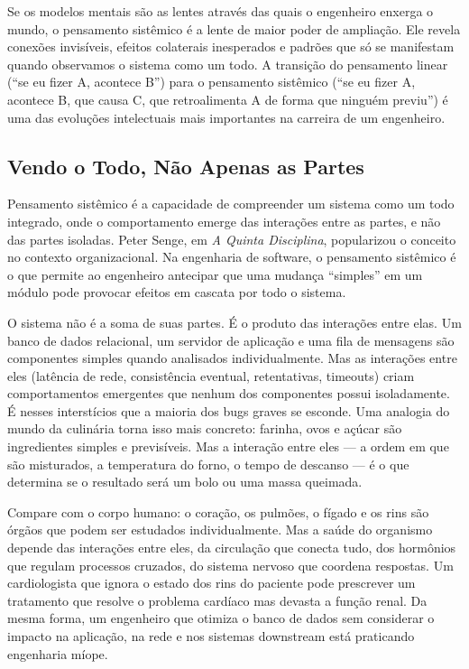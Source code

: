 Se os modelos mentais são as lentes através das quais o engenheiro
enxerga o mundo, o pensamento sistêmico é a lente de maior poder de
ampliação. Ele revela conexões invisíveis, efeitos colaterais inesperados
e padrões que só se manifestam quando observamos o sistema como um todo.
A transição do pensamento linear (``se eu fizer A, acontece B'') para o
pensamento sistêmico (``se eu fizer A, acontece B, que causa C, que
retroalimenta A de forma que ninguém previu'') é uma das evoluções
intelectuais mais importantes na carreira de um engenheiro.

\subsection{Vendo o Todo, Não Apenas as Partes}

Pensamento sistêmico é a capacidade de compreender um sistema como um
todo integrado, onde o comportamento emerge das interações entre as
partes, e não das partes isoladas. Peter Senge, em \emph{A Quinta
Disciplina}, popularizou o conceito no contexto organizacional. Na
engenharia de software, o pensamento sistêmico é o que permite ao
engenheiro antecipar que uma mudança ``simples'' em um módulo pode
provocar efeitos em cascata por todo o sistema.

O sistema não é a soma de suas partes. É o produto das interações
entre elas. Um banco de dados relacional, um servidor de aplicação e uma
fila de mensagens são componentes simples quando analisados individualmente.
Mas as interações entre eles (latência de rede, consistência eventual,
retentativas, timeouts) criam comportamentos emergentes que nenhum dos
componentes possui isoladamente. É nesses interstícios que a maioria dos
bugs graves se esconde. Uma analogia do mundo da culinária torna isso
mais concreto: farinha, ovos e açúcar são ingredientes simples e
previsíveis. Mas a interação entre eles --- a ordem em que são misturados,
a temperatura do forno, o tempo de descanso --- é o que determina se o
resultado será um bolo ou uma massa queimada.

Compare com o corpo humano: o coração, os pulmões, o fígado e os rins
são órgãos que podem ser estudados individualmente. Mas a saúde do
organismo depende das interações entre eles, da circulação que conecta
tudo, dos hormônios que regulam processos cruzados, do sistema nervoso
que coordena respostas. Um cardiologista que ignora o estado dos rins do
paciente pode prescrever um tratamento que resolve o problema cardíaco
mas devasta a função renal. Da mesma forma, um engenheiro que otimiza o
banco de dados sem considerar o impacto na aplicação, na rede e nos
sistemas downstream está praticando engenharia míope.

